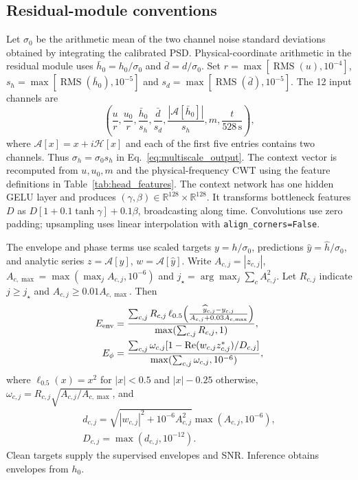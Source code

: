 \documentclass[10pt,prd,aps,a4paper,twocolumn,superscriptaddress,nofootinbib,floatfix]{revtex4-2}
\begin{document}
\subsection{Residual-module conventions}\label{app:residual_details}
Let $\sigma_0$ be the arithmetic mean of the two channel noise standard deviations obtained by integrating the calibrated PSD. Physical-coordinate arithmetic in the residual module uses $\bar h_0=h_0/\sigma_0$ and $\bar d=d/\sigma_0$. Set $r=\max[\operatorname{RMS}(u),10^{-4}]$, $s_h=\max[\operatorname{RMS}(\bar h_0),10^{-5}]$ and $s_d=\max[\operatorname{RMS}(\bar d),10^{-5}]$. The 12 input channels are
\begin{equation}
\left(\frac{u}{r},\frac{u_0}{r},\frac{\bar h_0}{s_h},\frac{\bar d}{s_d},\frac{|\mathcal A[\bar h_0]|}{s_h},m,\frac{t}{528\,\mathrm{s}}\right),
\end{equation}
where $\mathcal A[x]=x+i\mathcal H[x]$ and each of the first five entries contains two channels. Thus $\sigma_h=\sigma_0s_h$ in Eq.~\eqref{eq:multiscale_output}. The context vector is recomputed from $u,u_0,m$ and the physical-frequency CWT using the feature definitions in Table~\ref{tab:head_features}. The context network has one hidden GELU layer and produces $(\gamma,\beta)\in\mathbb R^{128}\times\mathbb R^{128}$. It transforms bottleneck features $D$ as $D[1+0.1\tanh\gamma]+0.1\beta$, broadcasting along time. Convolutions use zero padding; upsampling uses linear interpolation with \texttt{align\_corners=False}.

The envelope and phase terms use scaled targets $y=h/\sigma_0$, predictions $\widehat y=\widehat h/\sigma_0$, and analytic series $z=\mathcal A[y]$, $w=\mathcal A[\widehat y]$. Write $A_{c,j}=|z_{c,j}|$, $A_{c,\max}=\max(\max_j A_{c,j},10^{-6})$ and $j_\star=\arg\max_j\sum_c A_{c,j}^2$. Let $R_{c,j}$ indicate $j\ge j_\star$ and $A_{c,j}\ge0.01A_{c,\max}$. Then
\begin{align}
E_{\rm env}&=\frac{\sum_{c,j}R_{c,j}\,\ell_{0.5}\!\left(\frac{\widehat y_{c,j}-y_{c,j}}{A_{c,j}+0.03A_{c,\max}}\right)}{\max(\sum_{c,j}R_{c,j},1)},\nonumber\\
E_\phi&=\frac{\sum_{c,j}\omega_{c,j}[1-\operatorname{Re}(w_{c,j}z_{c,j}^*)/D_{c,j}]}{\max(\sum_{c,j}\omega_{c,j},10^{-6})},\label{eq:envelope_losses}
\end{align}
where $\ell_{0.5}(x)=x^2$ for $|x|<0.5$ and $|x|-0.25$ otherwise, $\omega_{c,j}=R_{c,j}\sqrt{A_{c,j}/A_{c,\max}}$, and
\begin{equation}
\begin{gathered}
d_{c,j}=\sqrt{|w_{c,j}|^2+10^{-6}A_{c,j}^2}\max(A_{c,j},10^{-6}),\\
D_{c,j}=\max(d_{c,j},10^{-12}).
\end{gathered}
\end{equation}
Clean targets supply the supervised envelopes and SNR. Inference obtains envelopes from $h_0$.
\end{document}
